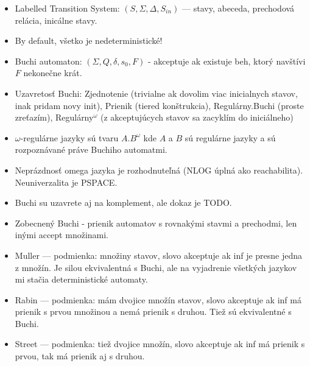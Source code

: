 \documentclass[paper=a4, fontsize=11pt]{scrartcl} %
\numberwithin{equation}{section} %
\numberwithin{figure}{section} %
\numberwithin{table}{section} %
\begin{document}
	\begin{itemize}
		\item Labelled Transition System: $(S, \Sigma, \Delta, S_{in})$ — stavy, abeceda, prechodová relácia, inicálne stavy.
		\item By default, všetko je nedeterministické!
		\item Buchi automaton: $(\Sigma, Q, \delta, s_0, F)$ - akceptuje ak existuje beh, ktorý navštívi $F$ nekonečne krát.
		\item Uzavretosť Buchi: Zjednotenie (trivialne ak dovolim viac inicialnych stavov, inak pridam novy init), Prienik (tiered konštrukcia), Regulárny.Buchi (proste zreťazím), Regulárny$^\omega$ (z akceptujúcych stavov sa zacyklím do iniciálneho)
		\item $\omega$-regulárne jazyky sú tvaru $A.B^\omega$ kde $A$ a $B$ sú regulárne jazyky a sú rozpoznávané práve Buchiho automatmi.
		\item Neprázdnosť omega jazyka je rozhodnuteľná (NLOG úplná ako reachabilita). Neuniverzalita je PSPACE.
		\item Buchi su uzavrete aj na komplement, ale dokaz je TODO.
		\item Zobecnený Buchi - prienik automatov s rovnakými stavmi a prechodmi, len inými accept množinami.
		
		\item Muller — podmienka: množiny stavov, slovo akceptuje ak inf je presne jedna z množín. Je silou ekvivalentná s Buchi, ale na vyjadrenie všetkých jazykov mi stačia deterministické automaty.
		\item Rabin — podmienka: mám dvojice množín stavov, slovo akceptuje ak inf má prienik s prvou množinou a nemá prienik s druhou. Tiež sú ekvivalentné s Buchi.
		\item Street — podmienka: tiež dvojice množín, slovo akceptuje ak inf má prienik s prvou, tak má prienik aj s druhou.
	\end{itemize}
\end{document}
